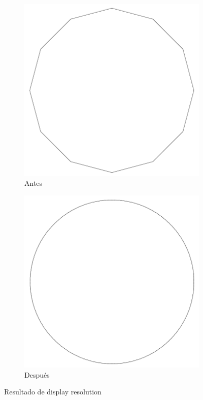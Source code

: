 \documentclass[12pt,letterpaper,final]{report}
\begin{document}
\begin{figure}[H]
	\centering
	\begin{subfigure}[b]{0.45\textwidth}
		\includegraphics[width=\textwidth]{Imagenes/autocad_display_resolution_03}
		\caption{Antes}
		\label{fig:autocaddisplayresolution03}
	\end{subfigure}
		\begin{subfigure}[b]{0.45\textwidth}
		\includegraphics[width=\textwidth]{Imagenes/autocad_display_resolution_04}
		\caption{Después}
		\label{fig:autocaddisplayresolution04}
	\end{subfigure}
	\caption{Resultado de display resolution}
\end{figure}
\end{document}
